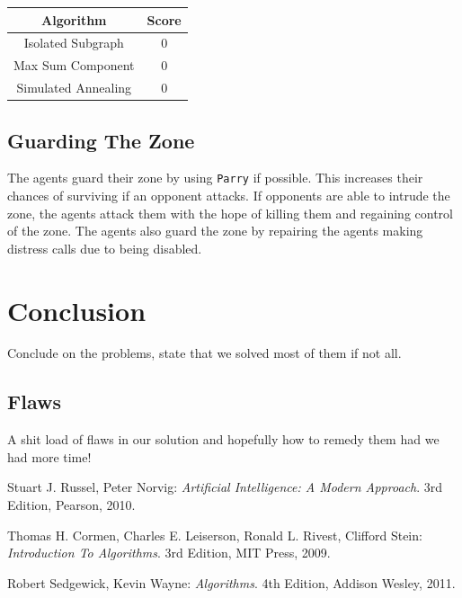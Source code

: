 \documentclass[11pt]{article}
\begin{document}
\begin{center}
\begin{tabular}{| c c |}
	\hline
	Algorithm & Score\\ \hline
	Isolated Subgraph & 0 \\
	Max Sum Component & 0 \\
	Simulated Annealing & 0 \\
\hline
\end{tabular}
\end{center}

\subsection{Guarding The Zone}
The agents guard their zone by using {\tt Parry} if possible. This increases their chances of surviving if an opponent attacks. If opponents are able to intrude the zone, the agents attack them with the hope of killing them and regaining control of the zone. The agents also guard the zone by repairing the agents making distress calls due to being disabled.

\section{Conclusion}
Conclude on the problems, state that we solved most of them if not all.

\subsection{Flaws}
A shit load of flaws in our solution and hopefully how to remedy them had we had more time!

\begin{thebibliography}{9}

 	Stuart J. Russel, Peter Norvig:
 	\emph{Artificial Intelligence: A Modern Approach}.
	3rd Edition, 	
	Pearson,
	2010.
	
 	Thomas H. Cormen, Charles E. Leiserson, Ronald L. Rivest, Clifford Stein:
	\emph{Introduction To Algorithms}.
	3rd Edition, 	
	MIT Press,
	2009.
	
 	Robert Sedgewick, Kevin Wayne:
	\emph{Algorithms}.
	4th Edition, 	
	Addison Wesley,
	2011.

\end{thebibliography}
\end{document}
